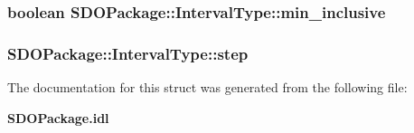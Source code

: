 \subsubsection[{min\_\-inclusive}]{\setlength{\rightskip}{0pt plus 5cm}boolean {\bf SDOPackage::IntervalType::min\_\-inclusive}}\label{structSDOPackage_1_1IntervalType_a1c39de81fb0c54339e906701a0874ef0}
\subsubsection[{step}]{ {\bf SDOPackage::IntervalType::step}}\label{structSDOPackage_1_1IntervalType_a8adfa6cc83bff1b0998457429290958f}


The documentation for this struct was generated from the following file:\begin{DoxyCompactItemize}
\item 
{\bf SDOPackage.idl}\end{DoxyCompactItemize}
